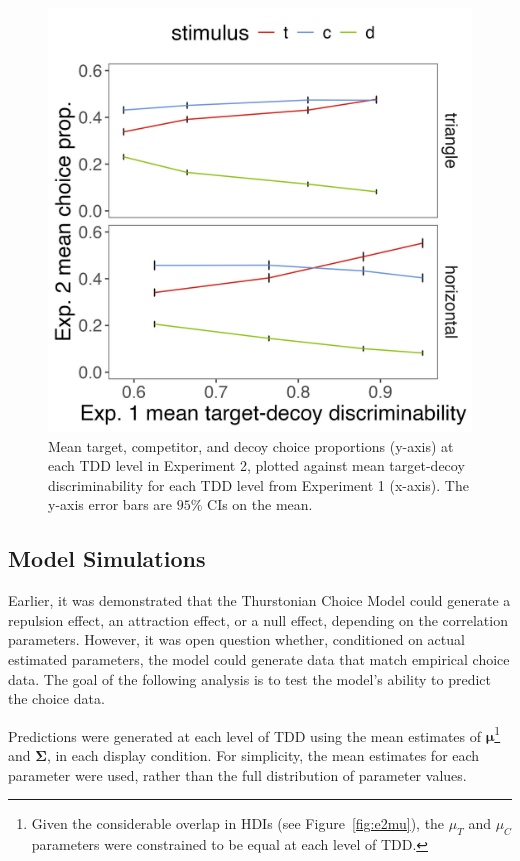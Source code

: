 \begin{figure}
   \centering
   \includegraphics[width=\textwidth]{figures/choicePhase_att_trials_compare_to_2afc_collapsed.jpeg}
   \caption{Mean target, competitor, and decoy choice proportions (y-axis) at each TDD level in Experiment 2, plotted against mean target-decoy discriminability for each TDD level from Experiment 1 (x-axis). The y-axis error bars are $95\%$ CIs on the mean.}
   \label{fig:e2_choice_compare_to_2afc}
\end{figure}

\subsection{Model Simulations}
Earlier, it was demonstrated that the Thurstonian Choice Model could generate a repulsion effect, an attraction effect, or a null effect, depending on the correlation parameters. However, it was open question whether, conditioned on actual estimated parameters, the model could generate data that match empirical choice data. The goal of the following analysis is to test the model's ability to predict the choice data. 

Predictions were generated at each level of TDD using the mean estimates of $\boldsymbol{\mu}$\footnote{Given the considerable overlap in HDIs (see Figure~\ref{fig:e2mu}), the $\mu_{T}$ and $\mu_{C}$ parameters were constrained to be equal at each level of TDD.} and $\boldsymbol{\Sigma}$, in each display condition. For simplicity, the mean estimates for each parameter were used, rather than the full distribution of parameter values.

